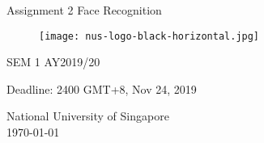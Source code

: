 \begin{titlepage}
    \begin{center}
        \vspace*{1cm}
        
        \Huge
          \textbf{\courseName}
        
        \vspace{0.5cm}
        \LARGE
        Assignment 2 Face Recognition
        
        \begin{figure}[htp]
            \centering
            \texttt{[image: nus-logo-black-horizontal.jpg]}
            \label{fig:galaxy}
        \end{figure}
        
        \vspace{1.5cm}
        \large
        SEM 1 AY2019/20
        \vspace{0.5cm}
        
        Deadline: 2400 GMT+8, Nov 24, 2019
        \vspace{1.5cm}
        
        \LARGE
        \textbf{\authorFullName}
   		  \vspace{1cm}
        
        \textbf{\authorUCO}
       
        \vfill
        
        \authorFieldOfStudy
        
        \vspace{0.8cm}
          \Large
        National University of Singapore\\
        \vspace{0.5cm}
       \today
        
    \end{center}
\end{titlepage}